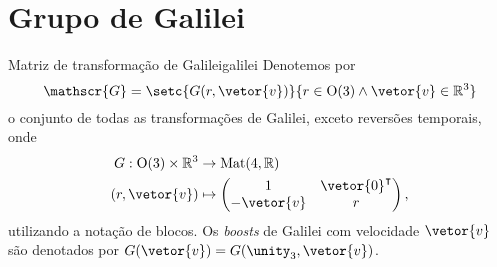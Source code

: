 \section{Grupo de Galilei}
\begin{definition}{Matriz de transformação de Galilei}{galilei}
    Denotemos por
    \begin{equation*}
        \mathscr{G} = \setc{G(r, \vetor{v})}{r \in \mathrm{O}(3) \land \vetor{v} \in \mathbb{R}^3}
    \end{equation*}
    o conjunto de todas as transformações de Galilei, exceto reversões temporais, onde
    \begin{align*}
        G : \mathrm{O}(3) \times \mathbb{R}^3 &\to \mathrm{Mat}(4, \mathbb{R})\\
                       (r,\vetor{v}) &\mapsto \begin{pmatrix}
                           1 & \vetor{0}^\intercal\\
                           -\vetor{v} & r
                       \end{pmatrix},
    \end{align*}
    utilizando a notação de blocos. Os \emph{boosts} de Galilei com velocidade \(\vetor{v}\) são denotados por \(G(\vetor{v}) = G(\unity_3, \vetor{v})\).
\end{definition}

